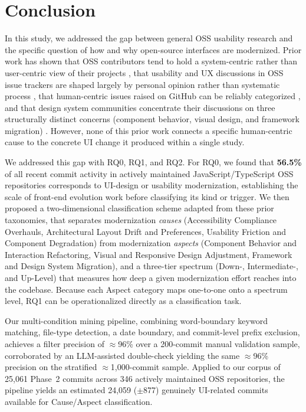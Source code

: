 \documentclass{article}
\begin{document}
\newpage
\section{Conclusion}

In this study, we addressed the gap between general OSS usability research
and the specific question of how and why open-source interfaces are
modernized. Prior work has shown that OSS contributors tend to hold a
system-centric rather than user-centric view of their projects
\cite{wang2022how, andreasen2006usability}, that usability and UX
discussions in OSS issue trackers are shaped largely by personal opinion
rather than systematic process \cite{cheng2018how}, that human-centric
issues raised on GitHub can be reliably categorized
\cite{khalajzadeh2022how}, and that design system communities concentrate
their discussions on three structurally distinct concerns (component
behavior, visual design, and framework migration)
\cite{lamine2022understanding}. However, none of this prior work connects
a specific human-centric cause to the concrete UI change it produced
within a single study.

We addressed this gap with RQ0, RQ1, and RQ2. For RQ0, we found that
\textbf{56.5\%} of all recent commit activity in actively maintained
JavaScript/TypeScript OSS repositories corresponds to UI-design or
usability modernization, establishing the scale of front-end evolution
work before classifying its kind or trigger. We then proposed a
two-dimensional classification scheme adapted from these prior
taxonomies, that separates modernization \emph{causes} (Accessibility
Compliance Overhauls, Architectural Layout Drift and Preferences,
Usability Friction and Component Degradation) from modernization
\emph{aspects} (Component Behavior and Interaction Refactoring, Visual
and Responsive Design Adjustment, Framework and Design System
Migration), and a three-tier spectrum (Down-, Intermediate-, and
Up-Level) that measures how deep a given modernization effort reaches
into the codebase. Because each Aspect category maps one-to-one onto a
spectrum level, RQ1 can be operationalized directly as a classification
task.

Our multi-condition mining pipeline, combining word-boundary keyword
matching, file-type detection, a date boundary, and commit-level prefix
exclusion, achieves a filter precision of $\approx$96\% over a
200-commit manual validation sample, corroborated by an LLM-assisted
double-check yielding the same $\approx$96\% precision on the stratified
$\approx$1,000-commit sample. Applied to our corpus of 25,061 Phase~2
commits across 346 actively maintained OSS repositories, the pipeline
yields an estimated 24,059 ($\pm$877) genuinely UI-related commits
available for Cause/Aspect classification.
\end{document}
